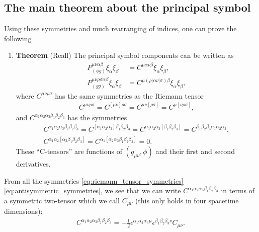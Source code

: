 \documentclass{ws-ijmpd}
\begin{document}
\subsection{The main theorem about the principal symbol
\label{thm:principal_symbol_rewrite}}
Using these symmetries and much rearranging of indices, 
one can prove the following
\begin{enumerate}
\item [] \textbf{Theorem} (Reall\cite{Reall:2021voz}) 
   The principal symbol components can be written as
\begin{align}
   P_{(\phi g)}^{\mu\nu\alpha\beta}
   \xi_{\alpha}\xi_{\beta}
   &=
   C^{\mu\alpha\nu\beta}
   \xi_{\alpha}\xi_{\beta}
   ,\\
   P_{(gg)}^{\mu\nu\rho\sigma\alpha\beta}
   \xi_{\alpha}\xi_{\beta}
   &=
   C^{\mu(\rho|\alpha\nu|\sigma)\beta}\xi_{\alpha}\xi_{\beta}
   ,
\end{align}
where $C^{\mu\nu\rho\sigma}$ has the same symmetries as the Riemann tensor
\begin{align}
\label{eq:riemann_tensor_symmetries}
   C^{\mu\nu\rho\sigma}
   =
   C^{[\mu\nu]\rho\sigma}
   =
   C^{\mu\nu[\rho\sigma]}
   =
   C^{\mu[\nu\rho\sigma]}
   ,
\end{align}
and $C^{\alpha_1\alpha_2\alpha_3\beta_1\beta_2\beta_3}$ has the symmetries
\begin{subequations}
\label{eq:antisymmetric_symmetries}
\begin{align}
   C^{\alpha_1\alpha_2\alpha_3\beta_1\beta_2\beta_3}
   =
   C^{[\alpha_1\alpha_2\alpha_3]\beta_1\beta_2\beta_3}
   =
   C^{\alpha_1\alpha_2\alpha_3[\beta_1\beta_2\beta_3]}
   =
   C^{\beta_1\beta_2\beta_3\alpha_1\alpha_2\alpha_3}
   ,\\
   C^{\alpha_1\alpha_2[\alpha_3\beta_1\beta_2\beta_3]}
   = 
   C^{\alpha_1[\alpha_2\alpha_3\beta_1\beta_2\beta_3]}
   =
   0
   .
\end{align}
\end{subequations}
These ``C-tensors'' are functions of $(g_{\mu\nu},\phi)$ and their
first and second derivatives.
\end{enumerate}
From all the symmetries \eqref{eq:riemann_tensor_symmetries} 
\eqref{eq:antisymmetric_symmetries}, 
we see that we can write
$C^{\alpha_1\alpha_2\alpha_3\beta_1\beta_2\beta_3}$
in terms of a symmetric two-tensor which we call $C_{\mu\nu}$
(this only holds in four spacetime dimensions): 
\begin{align}
   C^{\alpha_1\alpha_2\alpha_3\beta_1\beta_2\beta_3}
   =
   -
   \frac{1}{2}
   \epsilon^{\alpha_1\alpha_2\alpha_3\mu}
   \epsilon^{\beta_1 \beta_2 \beta_3 \nu}
   C_{\mu\nu}
   .
\end{align}
\end{document}
